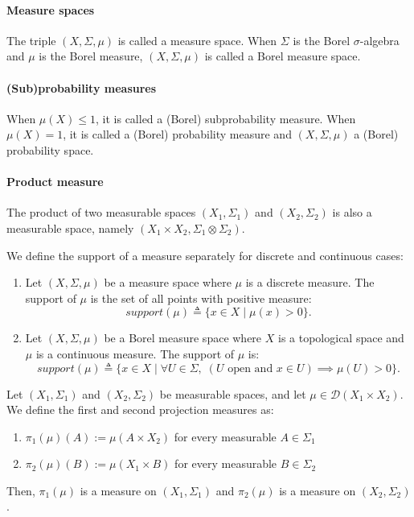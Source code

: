 \paragraph{Measure spaces} The triple $(X, \Sigma, \mu)$ is called a measure space.
 When $\Sigma$ is the Borel $\sigma$-algebra and $\mu$ is the Borel measure, $(X, \Sigma, \mu)$ is called a Borel measure space.

\paragraph{(Sub)probability measures} When $\mu(X) \leq 1$, it is called a (Borel) subprobability measure. When $\mu(X) = 1$, it is called a (Borel) probability measure and $(X, \Sigma, \mu)$ a (Borel) probability space.

\paragraph{Product measure} The product of two measurable spaces $(X_1, \Sigma_1)$ and $(X_2, \Sigma_2)$ is also a measurable space, namely $(X_1 \times X_2, \Sigma_1 \otimes \Sigma_2)$.

\begin{definition}[Support]
	We define the support of a measure separately for discrete and continuous cases:
	\begin{enumerate}
		\item Let $(X, \Sigma, \mu)$ be a measure space where $\mu$ is a discrete measure. The support of $\mu$ is the set of all points with positive measure:
		\[
			{support}(\mu) \triangleq \{ x \in X \mid \mu(x) > 0 \}.
		\]

		\item Let $(X, \Sigma, \mu)$ be a Borel measure space where $X$ is a topological space and $\mu$ is a continuous measure. The support of $\mu$ is:
		\[
			{support}(\mu) \triangleq \{ x \in X \mid \forall U \in \Sigma, \; (U \text{ open and } x \in U) \implies \mu(U) > 0 \}.
		\]
	\end{enumerate}
\end{definition}

\begin{definition}[Projection]
	Let $(X_1, \Sigma_1)$ and $(X_2, \Sigma_2)$ be measurable spaces, and let $\mu \in \mathcal{D}(X_1 \times X_2)$. We define the first and second projection measures as:
	\begin{enumerate}
		\item $\pi_1(\mu)(A) := \mu(A \times X_2)$ for every measurable $A \in \Sigma_1$
		\item $\pi_2(\mu)(B) := \mu(X_1 \times B)$ for every measurable $B \in \Sigma_2$
	\end{enumerate}
	Then, $\pi_1(\mu)$ is a measure on $(X_1, \Sigma_1)$ and $\pi_2(\mu)$ is a measure on $(X_2, \Sigma_2)$.
\end{definition}

